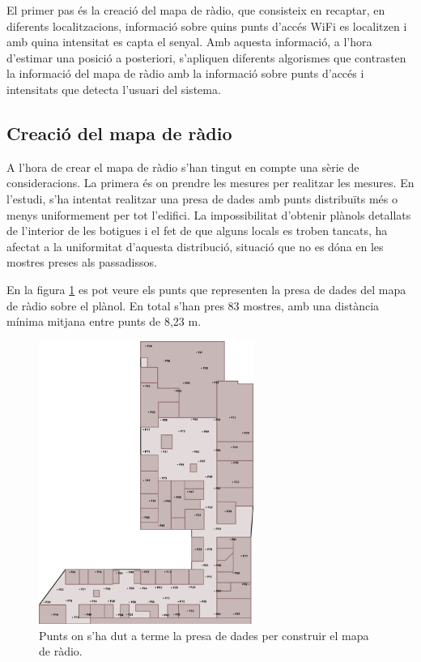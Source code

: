 El primer pas és la creació del mapa de ràdio, que consisteix en recaptar, en diferents localitzacions, informació sobre quins punts d'accés WiFi es localitzen i amb quina intensitat es capta el senyal. Amb aquesta informació, a l'hora d'estimar una posició a posteriori, s'apliquen diferents algorismes que contrasten la informació del mapa de ràdio amb la informació sobre punts d'accés i intensitats que detecta l'usuari del sistema.

\subsection{Creació del mapa de ràdio}

A l'hora de crear el mapa de ràdio s'han tingut en compte una sèrie de consideracions. La primera és on prendre les mesures per realitzar les mesures. En l'estudi, s'ha intentat realitzar una presa de dades amb punts distribuïts més o menys uniformement per tot l'edifici. La impossibilitat d'obtenir plànols detallats de l'interior de les botigues i el fet de que alguns locals es troben tancats, ha afectat a la uniformitat d'aquesta distribució, situació que no es dóna en les mostres preses als passadissos.

En la figura \ref{fig:planol_log} es pot veure els punts que representen la presa de dades del mapa de ràdio sobre el plànol. En total s'han pres 83 mostres, amb una distància mínima mitjana entre punts de 8,23 m.

\begin{figure}[ht]
\begin{center}
\includegraphics[width=7cm]{imatges/planol_log.png}
\caption{Punts on s'ha dut a terme la presa de dades per construir el mapa de ràdio.}
\label{fig:planol_log}
\end{center}
\end{figure}

